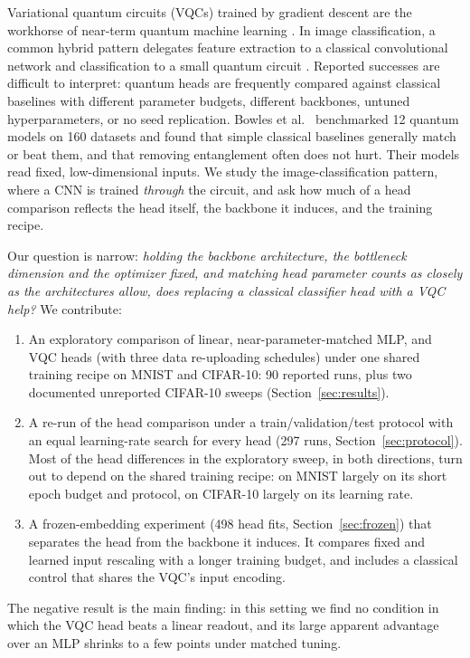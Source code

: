 \documentclass[10pt]{article}
\begin{document}
Variational quantum circuits (VQCs) trained by gradient descent are the
workhorse of near-term quantum machine learning
\citep{benedetti2019parameterized, cerezo2021variational}. In image
classification, a common hybrid pattern delegates feature extraction to a
classical convolutional network and classification to a small quantum circuit
\citep{mitarai2018quantum, havlicek2019supervised}. Reported successes are
difficult to interpret: quantum heads are frequently compared against classical
baselines with different parameter budgets, different backbones, untuned
hyperparameters, or no seed replication. Bowles et al.\ \citep{bowles2024better}
benchmarked 12 quantum models on 160 datasets and found that simple classical
baselines generally match or beat them, and that removing entanglement often
does not hurt. Their models read fixed, low-dimensional inputs. We study the
image-classification pattern, where a CNN is trained \emph{through} the circuit,
and ask how much of a head comparison reflects the head itself, the backbone it
induces, and the training recipe.

Our question is narrow: \emph{holding the backbone architecture, the bottleneck
dimension and the optimizer fixed, and matching head parameter counts as
closely as the architectures allow, does replacing a classical classifier head
with a VQC help?} We contribute:

\begin{enumerate}
  \item An exploratory comparison of linear, near-parameter-matched MLP, and
        VQC heads (with three data re-uploading schedules) under one shared
        training recipe on MNIST and CIFAR-10: 90 reported runs, plus two
        documented unreported CIFAR-10 sweeps (Section~\ref{sec:results}).
  \item A re-run of the head comparison under a train/validation/test protocol
        with an equal learning-rate search for every head (297 runs,
        Section~\ref{sec:protocol}). Most of the head differences in the
        exploratory sweep, in both directions, turn out to depend on the
        shared training recipe: on MNIST largely on its short epoch budget and
        protocol, on CIFAR-10 largely on its learning rate.
  \item A frozen-embedding experiment (498 head fits,
        Section~\ref{sec:frozen}) that separates the head from the backbone
        it induces. It compares fixed and learned input rescaling with a
        longer training budget, and includes a classical control that shares
        the VQC's input encoding.
\end{enumerate}
The negative result is the main finding: in this setting we find no condition
in which the VQC head beats a linear readout, and its large apparent advantage
over an MLP shrinks to a few points under matched tuning.
\end{document}
